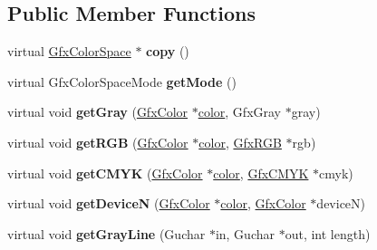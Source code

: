 \subsection*{Public Member Functions}
\begin{DoxyCompactItemize}
\item 
\mbox{\label{class_gfx_device_r_g_b_color_space_a17c7299d917d8ed91eb6b85daf6680b4}} 
virtual \hyperlink{class_gfx_color_space}{Gfx\+Color\+Space} $\ast$ {\bfseries copy} ()
\item 
\mbox{\label{class_gfx_device_r_g_b_color_space_a7e30334da11f114a4f713b21413f27d1}} 
virtual Gfx\+Color\+Space\+Mode {\bfseries get\+Mode} ()
\item 
\mbox{\label{class_gfx_device_r_g_b_color_space_a81324cfce1ad3fb98460a73d934c4db3}} 
virtual void {\bfseries get\+Gray} (\hyperlink{struct_gfx_color}{Gfx\+Color} $\ast$\hyperlink{structcolor}{color}, Gfx\+Gray $\ast$gray)
\item 
\mbox{\label{class_gfx_device_r_g_b_color_space_abbab8078bf5d31fd422ddbb76b5a2a44}} 
virtual void {\bfseries get\+R\+GB} (\hyperlink{struct_gfx_color}{Gfx\+Color} $\ast$\hyperlink{structcolor}{color}, \hyperlink{struct_gfx_r_g_b}{Gfx\+R\+GB} $\ast$rgb)
\item 
\mbox{\label{class_gfx_device_r_g_b_color_space_a22d28b3bb8a59db28b6160f63d9f89e1}} 
virtual void {\bfseries get\+C\+M\+YK} (\hyperlink{struct_gfx_color}{Gfx\+Color} $\ast$\hyperlink{structcolor}{color}, \hyperlink{struct_gfx_c_m_y_k}{Gfx\+C\+M\+YK} $\ast$cmyk)
\item 
\mbox{\label{class_gfx_device_r_g_b_color_space_a4d83af2eb8a9d0815a59508996acb6c6}} 
virtual void {\bfseries get\+DeviceN} (\hyperlink{struct_gfx_color}{Gfx\+Color} $\ast$\hyperlink{structcolor}{color}, \hyperlink{struct_gfx_color}{Gfx\+Color} $\ast$deviceN)
\item 
\mbox{\label{class_gfx_device_r_g_b_color_space_ae33640b0e1c2c2a6ecbd4f132565381b}} 
virtual void {\bfseries get\+Gray\+Line} (Guchar $\ast$in, Guchar $\ast$out, int length)

\end{DoxyCompactItemize}
